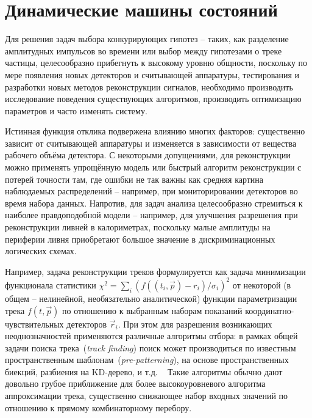 \section{Динамические машины состояний}

Для решения задач выбора конкурирующих гипотез -- таких, как разделение
амплитудных импульсов во времени или выбор между гипотезами о
треке частицы,
целесообразно прибегнуть к высокому уровню общности,
поскольку по мере появления новых детекторов и считывающей аппаратуры,
тестирования и разработки новых методов реконструкции сигналов,
необходимо производить исследование поведения существующих алгоритмов,
производить оптимизацию параметров и часто изменять систему.

Истинная функция отклика подвержена влиянию многих факторов: существенно
зависит от считывающей аппаратуры и изменяется в зависимости от вещества
рабочего объёма детектора.
С некоторыми допущениями, для реконструкции
можно применять упрощённую модель или быстрый алгоритм реконструкции с
потерей точности там, где ошибки не так важны как средняя картина
наблюдаемых распределений -- например, при
мониторировании детекторов во время набора данных.
Напротив, для задач анализа целесообразно
стремиться к наиболее правдоподобной модели -- например, для улучшения
разрешения при реконструкции ливней в калориметрах, поскольку
малые амплитуды на периферии ливня приобретают большое значение
в дискриминационных логических схемах.

Например, задача реконструкции треков формулируется
как задача минимизации функционала статистики
$\chi^2 = \sum\limits_i (f((t_i,\vec{p}) - r_i)/\sigma_i)^2$ от некоторой (в
общем -- нелинейной, необязательно аналитической) функции параметризации
трека $f(t,\vec{p})$ по отношению к выбранным наборам показаний
координатно-чувствительных детекторов $\vec{r}_i$. При этом
для разрешения возникающих неоднозначностей применяются различные
алгоритмы отбора: в рамках общей задачи поиска трека~(\emph{track finding})
поиск может производиться по известным пространственным
шаблонам~(\emph{pre-patterning}),
на основе пространственных биекций,
разбиения на KD-дерево, и т.д. ~\cite{MankelTracking, artificial-retina-tracking-lhc}
Такие алгоритмы обычно дают довольно грубое
приближение для более высокоуровневого алгоритма аппроксимации трека,
существенно снижающее набор входных значений по отношению к прямому
комбинаторному перебору.

